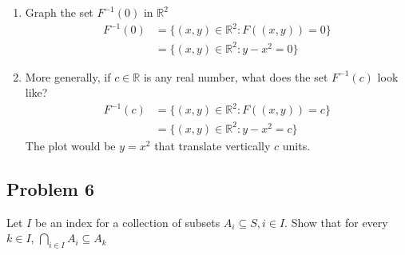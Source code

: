 \documentclass[11pt]{article}
\theoremstyle{plain}%
\theoremstyle{definition}
\theoremstyle{remark}
\newcommand{\R}{\mathbb{R}}
\begin{document}
\begin{enumerate}
  \item Graph the set $F^{-1}(0)$ in $\R^2$ \\
  \[
    \begin{split}
      F^{-1}(0) &= \{ (x, y)\in \R^2: F((x, y)) = 0 \} \\
      &= \{ (x, y)\in \R^2: y - x^2 = 0 \}
    \end{split}
  \]
  \begin{center}
  \end{center}
  \item More generally, if $c \in \R$ is any real number, what does the set $F^{-1}(c)$ look like?
  \[
    \begin{split}
      F^{-1}(c) &= \{ (x, y)\in \R^2: F((x, y)) = c \} \\
      &= \{ (x, y)\in \R^2: y - x^2 = c \}
    \end{split}
  \]
  The plot would be $y=x^2$ that translate vertically $c$ units.
\end{enumerate}


\subsection*{Problem 6}
Let $I$ be an index for a collection of subsets $A_{i}\subseteq S, i \in I$. Show that for every $k \in I$, $\bigcap_{i\in I}A_{i}\subseteq A_{k}$
\end{document}
